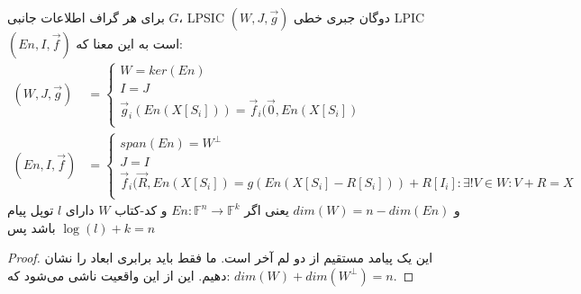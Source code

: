 \begin{theorem}
    \label{thm1}
    برای هر گراف اطلاعات جانبی 
    $G$، LPSIC $(W, J, \overrightarrow{g})$
     دوگان جبری خطی
      LPIC $(En, I, \overrightarrow{f})$ 
      است به این معنا که:
    \begin{align*}
    (W, J, \overrightarrow{g}) &= \begin{cases}
                                      W = ker(En)\\
                                      I = J \\
                                      \overrightarrow{g}_i(En(X[S_i])) = \overrightarrow{f}_i(\overrightarrow{0}, En(X[S_i])\\
    \end{cases} \\
    (En, I, \overrightarrow{f}) &= \begin{cases}
                                       span(En) = W^{\bot} \\
                                       J = I \\
                                       \overrightarrow{f}_i(\overrightarrow{R}, En(X[S_i]) = g(En(X[S_i] - R[S_i])) + R[I_i]: \exists! V \in W: V + R = X \\
    \end{cases}
    \end{align*}
    و 
    $dim(W) = n - dim(En)$
     یعنی اگر
     $En: \mathbb{F}^n \rightarrow \mathbb{F}^k$
      و کد-کتاب
      $W$ دارای $l$ توپل پیام باشد پس $\log(l) + k = n$
\end{theorem}
\begin{proof}
    این یک پیامد مستقیم از دو لم آخر است. ما فقط باید برابری ابعاد را نشان دهیم. این از این واقعیت ناشی می‌شود که: $dim(W) + dim(W^{\bot}) = n$.
\end{proof}
